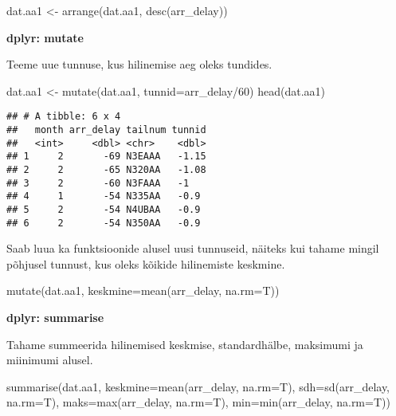 \documentclass[
]{book}
\newenvironment{Shaded}{\begin{snugshade}}{\end{snugshade}}
\newcommand{\AttributeTok}[1]{\textcolor[rgb]{0.77,0.63,0.00}{#1}}
\newcommand{\DecValTok}[1]{\textcolor[rgb]{0.00,0.00,0.81}{#1}}
\newcommand{\FunctionTok}[1]{\textcolor[rgb]{0.00,0.00,0.00}{#1}}
\newcommand{\NormalTok}[1]{#1}
\newcommand{\OtherTok}[1]{\textcolor[rgb]{0.56,0.35,0.01}{#1}}
\newcommand{\SpecialCharTok}[1]{\textcolor[rgb]{0.00,0.00,0.00}{#1}}
\begin{document}
\begin{Shaded}
\begin{Highlighting}[]
\NormalTok{dat.aa1 }\OtherTok{\textless{}{-}} \FunctionTok{arrange}\NormalTok{(dat.aa1, }\FunctionTok{desc}\NormalTok{(arr\_delay))}
\end{Highlighting}
\end{Shaded}

\textbf{dplyr: mutate}

Teeme uue tunnuse, kus hilinemise aeg oleks tundides.

\begin{Shaded}
\begin{Highlighting}[]
\NormalTok{dat.aa1 }\OtherTok{\textless{}{-}} \FunctionTok{mutate}\NormalTok{(dat.aa1, }\AttributeTok{tunnid=}\NormalTok{arr\_delay}\SpecialCharTok{/}\DecValTok{60}\NormalTok{)}
\FunctionTok{head}\NormalTok{(dat.aa1)}
\end{Highlighting}
\end{Shaded}

\begin{verbatim}
## # A tibble: 6 x 4
##   month arr_delay tailnum tunnid
##   <int>     <dbl> <chr>    <dbl>
## 1     2       -69 N3EAAA   -1.15
## 2     2       -65 N320AA   -1.08
## 3     2       -60 N3FAAA   -1   
## 4     1       -54 N335AA   -0.9 
## 5     2       -54 N4UBAA   -0.9 
## 6     2       -54 N350AA   -0.9
\end{verbatim}

Saab luua ka funktsioonide alusel uusi tunnuseid, näiteks kui tahame mingil põhjusel tunnust, kus oleks kõikide hilinemiste keskmine.

\begin{Shaded}
\begin{Highlighting}[]
\FunctionTok{mutate}\NormalTok{(dat.aa1, }\AttributeTok{keskmine=}\FunctionTok{mean}\NormalTok{(arr\_delay, }\AttributeTok{na.rm=}\NormalTok{T))}
\end{Highlighting}
\end{Shaded}

\textbf{dplyr: summarise}

Tahame summeerida hilinemised keskmise, standardhälbe, maksimumi ja miinimumi alusel.

\begin{Shaded}
\begin{Highlighting}[]
\FunctionTok{summarise}\NormalTok{(dat.aa1, }
          \AttributeTok{keskmine=}\FunctionTok{mean}\NormalTok{(arr\_delay, }\AttributeTok{na.rm=}\NormalTok{T),}
          \AttributeTok{sdh=}\FunctionTok{sd}\NormalTok{(arr\_delay, }\AttributeTok{na.rm=}\NormalTok{T),}
          \AttributeTok{maks=}\FunctionTok{max}\NormalTok{(arr\_delay, }\AttributeTok{na.rm=}\NormalTok{T),}
          \AttributeTok{min=}\FunctionTok{min}\NormalTok{(arr\_delay, }\AttributeTok{na.rm=}\NormalTok{T))}
\end{Highlighting}
\end{Shaded}
\end{document}
